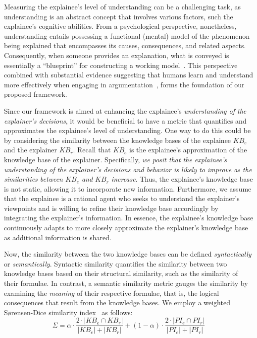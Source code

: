 \documentclass[letterpaper]{article} %
\begin{document}
Measuring the explainee's level of understanding can be a challenging task, as understanding is an abstract concept that involves various factors, such the explainee's cognitive abilities. From a psychological perspective, nonetheless, understanding entails possessing a functional (mental) model of the phenomenon being explained that encompasses its causes, consequences, and related aspects. Consequently, when someone provides an explanation, what is conveyed is essentially a ``blueprint'' for constructing a working model~\cite{johnson1983mental}. This perspective combined with substantial evidence suggesting that humans learn and understand more effectively when engaging in argumentation~\cite{mercier2011humans}, forms the foundation of our proposed framework.

Since our framework is aimed at enhancing the explainee's \textit{understanding of the explainer's decisions}, it would be beneficial to have a metric that quantifies and approximates the explainee's level of understanding. One way to do this could be by considering the similarity between the knowledge bases of the explainee $KB_e$ and the explainer $KB_r$. Recall that $KB_e$ is the explainee's approximation of the knowledge base of the explainer. %
Specifically, \emph{we posit that the explainee's understanding of the explainer's decisions and behavior is likely to improve as the similarities between $KB_e$ and $KB_r$ increase}.
Thus, the explainee's knowledge base is not static, allowing it to incorporate new information. Furthermore, we assume that the explainee is a rational agent who seeks to understand the explainer's viewpoints and is willing to refine their knowledge base accordingly by integrating the explainer's information. In essence, the explainee's knowledge base continuously adapts to more closely approximate the explainer's knowledge base as additional information is shared.

Now, the similarity between the two knowledge bases can be defined \emph{syntactically} or \emph{semantically}. Syntactic similarity quantifies the similarity between two knowledge bases based on their structural similarity, such as the similarity of their formulae. In contrast, a semantic similarity metric gauges the similarity by examining the \emph{meaning} of their respective formulae, that is, the logical consequences that result from the knowledge bases. We employ a weighted Sørensen-Dice similarity index~\cite{dice1945measures,sorensen1948method} as follows:
\begin{equation}
    \Sigma = \alpha \cdot \frac{2\cdot|KB_e \cap KB_r|}{|KB_e|+|KB_r|} +(1-\alpha)\cdot \frac{2\cdot|PI_e \cap PI_r|}{|PI_e|+|PI_r|} 
\end{equation} 
\end{document}

